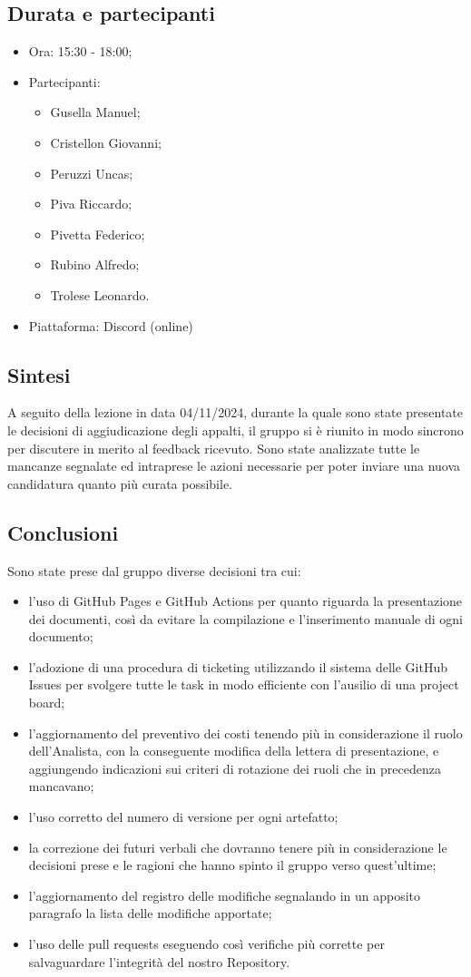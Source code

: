 \documentclass[12pt]{article}
\begin{document}
\subsection{Durata e partecipanti}
\begin{itemize}
\item Ora: 15:30 - 18:00;
\item Partecipanti: 	
	\begin{itemize}
	\item Gusella Manuel;
	\item Cristellon Giovanni;
	\item Peruzzi Uncas;
	\item Piva Riccardo;
	\item Pivetta Federico;
	\item Rubino Alfredo;
	\item Trolese Leonardo.
	\end{itemize}
\item Piattaforma: Discord (online)
\end{itemize}
\subsection{Sintesi}
A seguito della lezione in data 04/11/2024, durante la quale sono state presentate le decisioni di aggiudicazione degli appalti, il gruppo si è riunito in modo sincrono per discutere in merito al feedback ricevuto. Sono state analizzate tutte le mancanze segnalate ed intraprese le azioni necessarie per poter inviare una nuova candidatura quanto più curata possibile.
\subsection{Conclusioni}
Sono state prese dal gruppo diverse decisioni tra cui:
\begin{itemize}
\item l'uso di GitHub Pages e GitHub Actions per quanto riguarda la presentazione dei documenti, così da evitare la compilazione e l'inserimento manuale di ogni documento;
\item l'adozione di una procedura di ticketing utilizzando il sistema delle GitHub Issues per svolgere tutte le task in modo efficiente con l'ausilio di una project board;
\item l'aggiornamento del preventivo dei costi tenendo più in considerazione il ruolo dell'Analista, con la conseguente modifica della lettera di presentazione, e aggiungendo indicazioni sui criteri di rotazione dei ruoli che in precedenza mancavano;
\item l'uso corretto del numero di versione per ogni artefatto;
\item la correzione dei futuri verbali che dovranno tenere più in considerazione le decisioni prese e le ragioni che hanno spinto il gruppo verso quest'ultime; 
\item l'aggiornamento del registro delle modifiche segnalando in un apposito paragrafo la lista delle modifiche apportate;
\item l'uso delle pull requests eseguendo così verifiche più corrette per salvaguardare l'integrità del nostro Repository.
\end{itemize}
\end{document}
